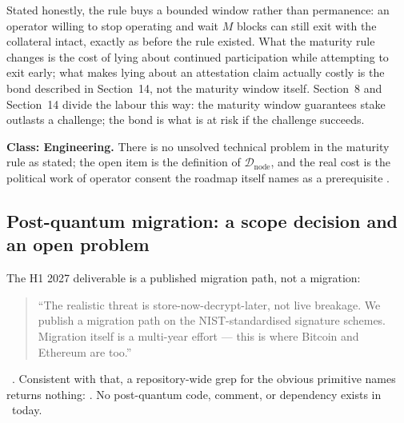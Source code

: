 Stated honestly, the rule buys a bounded window rather than permanence: an operator willing to stop
operating and wait $M$ blocks can still exit with the collateral intact, exactly as before the rule
existed. What the maturity rule changes is the cost of lying about continued participation while
attempting to exit early; what makes lying about an attestation claim actually costly is the bond
described in Section~14, not the maturity window itself. Section~8 and Section~14 divide the labour
this way: the maturity window guarantees stake outlasts a challenge; the bond is what is at risk if the
challenge succeeds.

\textbf{Class: Engineering.} There is no unsolved technical problem in the maturity rule as stated; the
open item is the definition of $\mathcal{D}_{\text{node}}$, and the real cost is the political work of
operator consent the roadmap itself names as a prerequisite .

\subsection{Post-quantum migration: a scope decision and an open problem}

The H1 2027 deliverable is a published migration path, not a migration:

\begin{quote}
``The realistic threat is store-now-decrypt-later, not live breakage. We publish a migration path on
the NIST-standardised signature schemes. Migration itself is a multi-year effort — this is where
Bitcoin and Ethereum are too.'' 
\end{quote}

\vision\ . Consistent with that, a repository-wide grep for
the obvious primitive names returns nothing: . No post-quantum code, comment, or dependency exists in \fluxd\ today.

